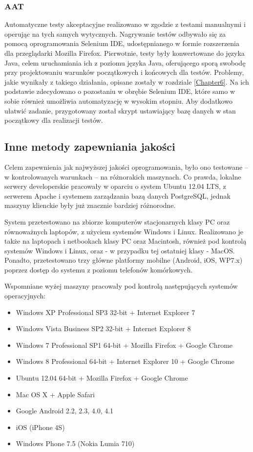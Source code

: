 \subsubsection{AAT}
\label{Chapter7131}

Automatyczne testy akceptacyjne realizowano w zgodzie z testami manualnymi i operując na tych samych wytycznych. Nagrywanie testów odbywało się za pomocą oprogramowania Selenium IDE, udostępnianego w formie rozszerzenia dla przeglądarki Mozilla Firefox. Pierwotnie, testy były konwertowane do języka Java, celem uruchamiania ich z poziomu języka Java, oferującego sporą swobodę przy projektowaniu warunków początkowych i końcowych dla testów. Problemy, jakie wynikały z takiego działania, opisane zostały w rozdziale \ref{Chapter6}. Na ich podstawie zdecydowano o pozostaniu w obrębie Selenium IDE, które samo w sobie również umożliwia automatyzację w wysokim stopniu. Aby dodatkowo ułatwić zadanie, przygotowany został skrypt ustawiający bazę danych w stan początkowy dla realizacji testów.

\subsection{Inne metody zapewniania jakości}
\label{Chapter714}

Celem zapewnienia jak najwyższej jakości oprogramowania, było ono testowane -- w kontrolowanych warunkach -- na różnorakich maszynach. Co prawda, lokalne serwery developerskie pracowały w oparciu o system Ubuntu 12.04 LTS, z serwerem Apache i systemem zarządzania bazą danych PostgreSQL, jednak maszyny klienckie były już znacznie bardziej różnorodne.

System przetestowano na zbiorze komputerów stacjonarnych klasy PC oraz równoważnych laptopów, z użyciem systemów Windows i Linux. Realizowano je także na laptopach i netbookach klasy PC oraz Macintosh, również pod kontrolą systemów Windows i Linux, oraz - w przypadku tej ostatniej klasy - MacOS. Ponadto, przetestowano trzy główne platformy mobilne (Android, iOS, WP7.x) poprzez dostęp do systemu z poziomu telefonów komórkowych.

Wspomniane wyżej maszyny pracowały pod kontrolą następujących systemów operacyjnych:
\begin{itemize}
\item{Windows XP Professional SP3 32-bit + Internet Explorer 7}
\item{Windows Vista Business SP2 32-bit + Internet Explorer 8}
\item{Windows 7 Professional SP1 64-bit + Mozilla Firefox + Google Chrome}
\item{Windows 8 Professional 64-bit + Internet Explorer 10 + Google Chrome}
\item{Ubuntu 12.04 64-bit + Mozilla Firefox + Google Chrome}
\item{Mac OS X + Apple Safari}
\item{Google Android 2.2, 2.3, 4.0, 4.1}
\item{iOS (iPhone 4S)}
\item{Windows Phone 7.5 (Nokia Lumia 710)}
\end{itemize}

